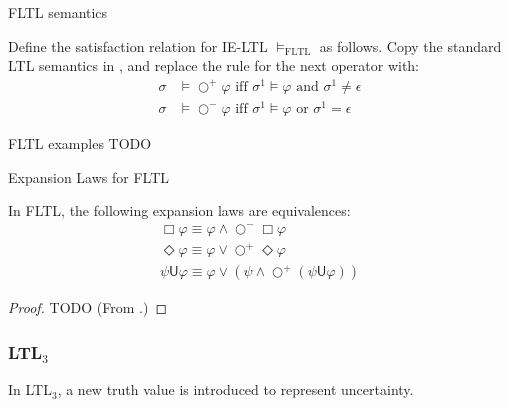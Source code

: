 \documentclass[a4paper]{article}
\newcommand{\U}{\mathsf{U}}
\newcommand{\tand}{\text{ and }}
\newcommand{\tor}{\text{ or }}
\newcommand{\tiff}{\text{ iff }}
\newcommand{\sn}{\bigcirc^+}
\newcommand{\wn}{\bigcirc^-}
\newcommand{\ltlt}{LTL$_3$}
\begin{document}
\begin{defn}{FLTL semantics}

  Define the satisfaction relation for IE-LTL $\vDash_{\text{FLTL}}$ as follows.
  Copy the standard LTL semantics in , and replace the rule for the next operator with:
  \begin{align*}
    \sigma&\vDash\sn\varphi \tiff \sigma^1\vDash\varphi \tand \sigma^1 \neq \epsilon\\
    \sigma&\vDash\wn\varphi \tiff \sigma^1\vDash\varphi \tor \sigma^1 = \epsilon
  \end{align*}
\end{defn}

\begin{eg}{FLTL examples}
  TODO
\end{eg}

\begin{lem}{Expansion Laws for FLTL}\label{fltlexp}

  In FLTL, the following expansion laws are equivalences:
  \begin{align}
    \Box \varphi \equiv \varphi \land \wn \Box \varphi \label{felBox}\\
    \Diamond \varphi \equiv \varphi \lor \sn \Diamond \varphi\label{felDiamond}\\
    \psi \U \varphi \equiv \varphi \lor (\psi \land \sn (\psi \U \varphi))\label{felU}
  \end{align}

\end{lem}

\begin{proof}
  TODO (From \autocite{bauer2010comparing}.)
\end{proof}

\subsubsection{\ltlt} In \ltlt, a new truth value is introduced to represent uncertainty.
\end{document}
